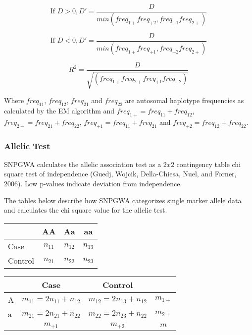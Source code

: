 \begin{equation*}
\text{If } D > 0, D' = \frac{D}{min\left(freq_{1+}freq_{+2}, freq_{+1}freq_{2+}\right)}
\end{equation*}

\begin{equation*}
  \text{If } D < 0, D' = \frac{D}{min\left(freq_{1+}freq_{+1}, freq_{+2}freq_{2+}\right)}
\end{equation*}

\begin{equation*}
  R^2 = \frac{D}{\sqrt{\left(freq_{1+}freq_{2+}freq_{+1}freq_{+2}\right)}}
\end{equation*}

Where $freq_{11}$, $freq_{12}$, $freq_{21}$ and $freq_{22}$ are autosomal
haplotype frequencies as calculated by the EM algorithm and
$freq_{1+} = freq_{11} + freq_{12}$, $freq_{2+} = freq_{21} + freq_{22}$,
$freq_{+1} = freq_{11} + freq_{21}$ and $freq_{+2} = freq_{12} + freq_{22}$.

\subsubsection{Allelic Test}

SNPGWA calculates the allelic association test as a $2 x 2$ contingency table
chi square test of independence (Guedj, Wojcik, Della-Chiesa, Nuel, and Forner,
2006).  Low p-values indicate deviation from independence.

The tables below describe how SNPGWA categorizes single marker allele data and
calculates the chi square value for the allelic test.

\begin{center}
  \begin{tabular}{lccc}
    \hline
    {}     & \textbf{AA} & \textbf{Aa} & \textbf{aa} \\
    \hline
    Case    & $n_{11}$ & $n_{12}$ & $n_{13}$ \\
    Control & $n_{21}$ &  $n_{22}$ & $n_{23}$ \\
    \hline
  \end{tabular}
\end{center}

\begin{center}
  \begin{tabular}{lccc}
    \hline
    {} & Case & Control & {} \\
    \hline
    A  & $m_{11} = 2n_{11} + n_{12}$ & $m_{12} = 2n_{13} + n_{12}$ & $m_{1+}$ \\
    a  & $m_{21} = 2n_{21} + n_{22}$ & $m_{22} = 2n_{23} + n_{22}$ & $m_{2+}$ \\
    {} & $m_{+1}$                  & $m_{+2}$                   & $m$     \\
    \hline
  \end{tabular}
\end{center}

